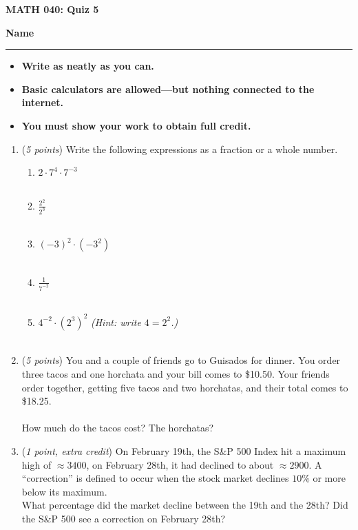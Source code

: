 \documentclass[12 pt]{article}
\begin{document}
  \begin{center}
    \textbf{\hfill MATH 040: Quiz 5} \\
  \end{center}
  \medskip

  \noindent
  \textbf{Name}\ \rule{3.5in}{.4pt} \hfill
  \vspace{.1in}
  \hspace*{0.2in}
  \begin{itemize}
    \item \textbf{Write as neatly as you can.}
    \item \textbf{Basic calculators are allowed---but nothing connected to the internet.}
    \item \textbf{You must show your work to obtain full credit.}
  \end{itemize}

	\medskip
  \noindent

  \begin{enumerate}
    \item (\textit{5 points})
    Write the following expressions as a fraction or a whole number.
    \begin{enumerate}
      \item $2\cdot7^4\cdot7^{-3}$
      \\~\\
      \item $\displaystyle\frac{2^2}{2^3}$
      \\~\\
      \item $(-3)^2\cdot(-3^2)$
      \\~\\
      \item $\displaystyle\frac{1}{7^{-2}}$
      \\~\\
      \item $\displaystyle 4^{-2} \cdot (2^3)^2$
      \hspace{1cm}\textit{(Hint: write $4 = 2^2$.)}
      \\~\\
    \end{enumerate}
		\pagebreak
		\item (\textit{5 points})
    You and a couple of friends go to Guisados for dinner. You order three tacos and one horchata and your bill comes to \$10.50. Your friends order together, getting five tacos and two horchatas, and their total comes to \$18.25.
    \\~\\
    How much do the tacos cost? The horchatas?
    \vspace{4in}
    \item (\textit{1 point, extra credit})
    On February 19th, the S\&P 500 Index hit a maximum high of $\approx 3400$, on February 28th, it had declined to about $\approx 2900$. A ``correction'' is defined to occur when the stock market declines $10\%$ or more below its maximum.\\
    What percentage did the market decline between the 19th and the 28th?
    Did the S\&P 500 see a correction on February 28th?
  \end{enumerate}
\end{document}
